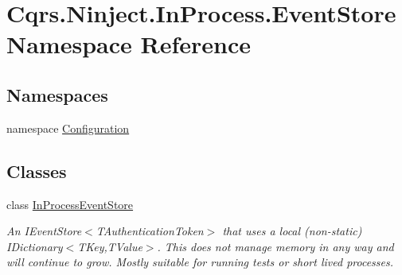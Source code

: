 \hypertarget{namespaceCqrs_1_1Ninject_1_1InProcess_1_1EventStore}{}\section{Cqrs.\+Ninject.\+In\+Process.\+Event\+Store Namespace Reference}
\label{namespaceCqrs_1_1Ninject_1_1InProcess_1_1EventStore}
\subsection*{Namespaces}
\begin{DoxyCompactItemize}
\item 
namespace \hyperlink{namespaceCqrs_1_1Ninject_1_1InProcess_1_1EventStore_1_1Configuration}{Configuration}
\end{DoxyCompactItemize}
\subsection*{Classes}
\begin{DoxyCompactItemize}
\item 
class \hyperlink{classCqrs_1_1Ninject_1_1InProcess_1_1EventStore_1_1InProcessEventStore}{In\+Process\+Event\+Store}
\begin{DoxyCompactList}\small\item\em An I\+Event\+Store$<$\+T\+Authentication\+Token$>$ that uses a local (non-\/static) I\+Dictionary$<$\+T\+Key,\+T\+Value$>$. This does not manage memory in any way and will continue to grow. Mostly suitable for running tests or short lived processes. \end{DoxyCompactList}\end{DoxyCompactItemize}
